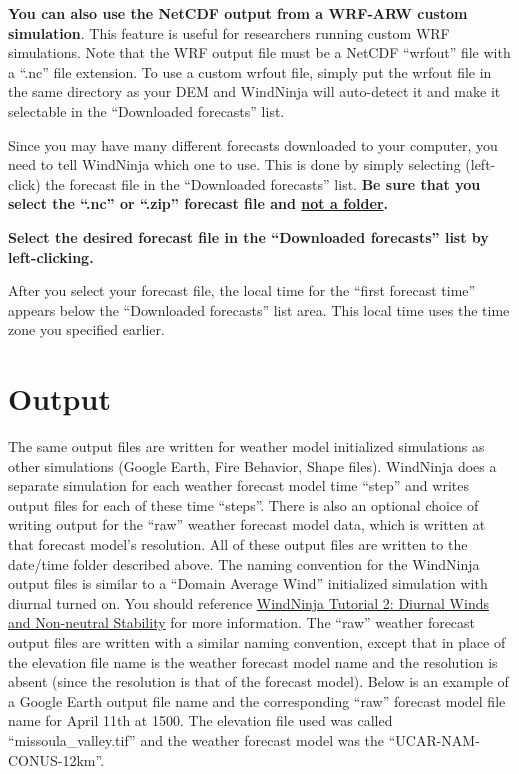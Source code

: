 \documentclass[12pt]{article}
\begin{document}
\textbf{You can also use the NetCDF output from a WRF-ARW custom simulation}. This feature is useful for researchers running custom WRF simulations. Note that the WRF output file must be a NetCDF “wrfout” file with a “.nc” file extension. To use a custom wrfout file, simply put the wrfout file in the same directory as your DEM and WindNinja will auto-detect it and make it selectable in the “Downloaded forecasts” list.

Since you may have many different forecasts downloaded to your computer, you need to tell WindNinja which one to use.  This is done by simply selecting (left-click) the forecast file in the “Downloaded forecasts” list.  \textbf{Be sure that you select the “.nc” or “.zip” forecast file and \underline{not a folder}.}

\textbf{\color{red}Select the desired forecast file in the “Downloaded forecasts” list by left-clicking.}

After you select your forecast file, the local time for the “first forecast time” appears below the “Downloaded forecasts” list area.  This local time uses the time zone you specified earlier.

\section{Output}
The same output files are written for weather model initialized simulations as other simulations (Google Earth, Fire Behavior, Shape files).  WindNinja does a separate simulation for each weather forecast model time “step” and writes output files for each of these time “steps”.  There is also an optional choice of writing output for the “raw” weather forecast model data, which is written at that forecast model's resolution.  All of these output files are written to the date/time folder described above.  The naming convention for the WindNinja output files is similar to a “Domain Average Wind” initialized simulation with diurnal turned on.  You should reference \href{https://weather.firelab.org/windninja/tutorials/WindNinja_tutorial2.pdf}{WindNinja Tutorial 2: Diurnal Winds and Non-neutral Stability} for more information.  The “raw” weather forecast output files are written with a similar naming convention, except that in place of the elevation file name is the weather forecast model name and the resolution is absent (since the resolution is that of the forecast model).  Below is an example of a Google Earth output file name and the corresponding “raw” forecast model file name for April 11th at 1500.  The elevation file used was called “missoula\_valley.tif” and the weather forecast model was the “UCAR-NAM-CONUS-12km”.
\end{document}
